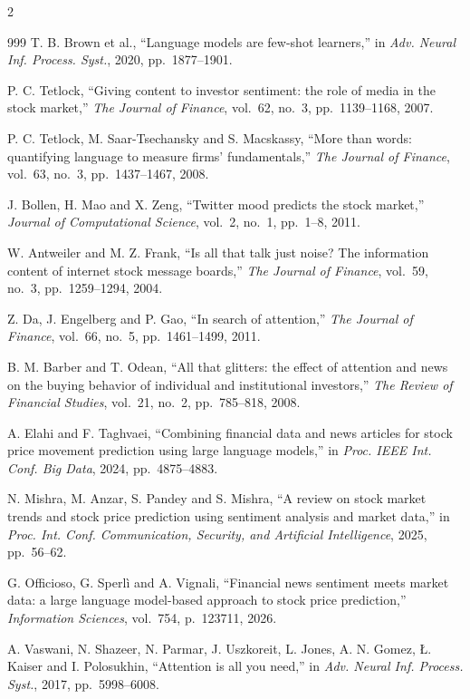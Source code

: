 \begin{footnotesize}
\begin{multicols}{2}
\begin{thebibliography}{999}
 T. B. Brown et al., ``Language models are few-shot learners,'' in
\emph{Adv. Neural Inf. Process. Syst.}, 2020, pp.~1877--1901.

 P. C. Tetlock, ``Giving content to investor sentiment: the role of media in
the stock market,'' \emph{The Journal of Finance}, vol.~62, no.~3, pp.~1139--1168, 2007.

 P. C. Tetlock, M. Saar-Tsechansky and S. Macskassy, ``More than words:
quantifying language to measure firms' fundamentals,'' \emph{The Journal of Finance}, vol.~63,
no.~3, pp.~1437--1467, 2008.

 J. Bollen, H. Mao and X. Zeng, ``Twitter mood predicts the stock market,''
\emph{Journal of Computational Science}, vol.~2, no.~1, pp.~1--8, 2011.

 W. Antweiler and M. Z. Frank, ``Is all that talk just noise? The
information content of internet stock message boards,'' \emph{The Journal of Finance}, vol.~59,
no.~3, pp.~1259--1294, 2004.

 Z. Da, J. Engelberg and P. Gao, ``In search of attention,'' \emph{The
Journal of Finance}, vol.~66, no.~5, pp.~1461--1499, 2011.

 B. M. Barber and T. Odean, ``All that glitters: the effect of attention and
news on the buying behavior of individual and institutional investors,'' \emph{The Review of
Financial Studies}, vol.~21, no.~2, pp.~785--818, 2008.

 A. Elahi and F. Taghvaei, ``Combining financial data and news articles for
stock price movement prediction using large language models,'' in \emph{Proc. IEEE Int. Conf. Big
Data}, 2024, pp.~4875--4883.

 N. Mishra, M. Anzar, S. Pandey and S. Mishra, ``A review on stock market
trends and stock price prediction using sentiment analysis and market data,'' in \emph{Proc. Int.
Conf. Communication, Security, and Artificial Intelligence}, 2025, pp.~56--62.

 G. Officioso, G. Sperl\`i and A. Vignali, ``Financial news sentiment meets
market data: a large language model-based approach to stock price prediction,'' \emph{Information
Sciences}, vol.~754, p.~123711, 2026.

 A. Vaswani, N. Shazeer, N. Parmar, J. Uszkoreit, L. Jones, A. N. Gomez,
{\L}. Kaiser and I. Polosukhin, ``Attention is all you need,'' in \emph{Adv. Neural Inf. Process.
Syst.}, 2017, pp.~5998--6008.


\end{thebibliography}
\end{multicols}
\end{footnotesize}

